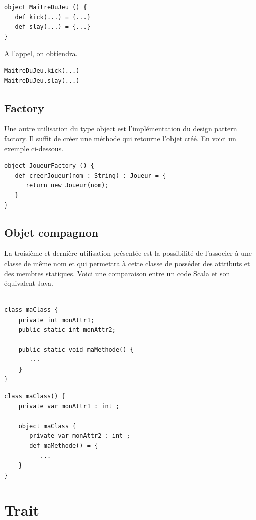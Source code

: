 \documentclass[a4paper,11pt]{report}
\begin{document}
{\begin{lstlisting}
object MaitreDuJeu () {
   def kick(...) = {...}
   def slay(...) = {...}
}
\end{lstlisting}

\normalsize{
\noindent
A l'appel, on obtiendra.
}

\begin{lstlisting}
MaitreDuJeu.kick(...)
MaitreDuJeu.slay(...)
\end{lstlisting}

\subsection{Factory}
\vspace{6mm}
\normalsize{
Une autre utilisation du type object est l'implémentation du design pattern factory. Il suffit de créer une méthode qui retourne l'objet créé. En voici un exemple ci-dessous.
}

\begin{lstlisting}
object JoueurFactory () {
   def creerJoueur(nom : String) : Joueur = {
      return new Joueur(nom);
   }
}
\end{lstlisting}

\subsection{Objet compagnon}
\vspace{6mm}
\normalsize{
La troisième et dernière utilisation présentée est la possibilité de l'associer à une classe de même nom et qui permettra à cette classe de posséder des attributs et des membres statiques. Voici une comparaison entre un code Scala et son équivalent Java.\\ \\
}

\begin{lstlisting}
class maClass {
    private int monAttr1;
    public static int monAttr2;

    public static void maMethode() {
       ...
    }
}
\end{lstlisting}
\vspace{6mm}
\begin{lstlisting}
class maClass() {
    private var monAttr1 : int ;

    object maClass {
       private var monAttr2 : int ;
       def maMethode() = {
          ...
    }
}
\end{lstlisting}

\section{Trait}

}
\end{document}
